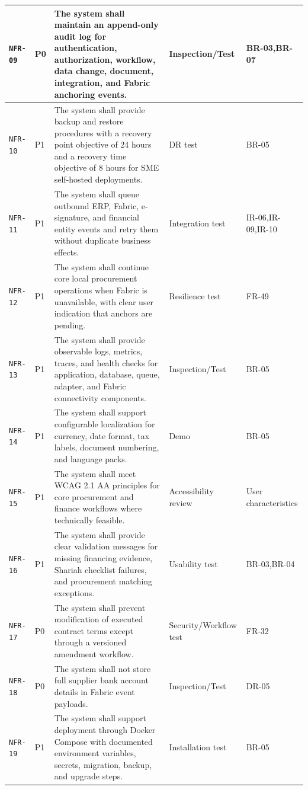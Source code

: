 \documentclass[11pt,a4paper]{article}
\begin{document}
\begin{footnotesize}
\begin{longtable}{@{}p{}p{}p{}p{}p{}@{}}
\texttt{NFR-09} & P0 & The system shall maintain an append-only audit log for authentication, authorization, workflow, data change, document, integration, and Fabric anchoring events. & Inspection/Test & BR-03,BR-07 \\ \hline
\texttt{NFR-10} & P1 & The system shall provide backup and restore procedures with a recovery point objective of 24 hours and a recovery time objective of 8 hours for SME self-hosted deployments. & DR test & BR-05 \\ \hline
\texttt{NFR-11} & P1 & The system shall queue outbound ERP, Fabric, e-signature, and financial entity events and retry them without duplicate business effects. & Integration test & IR-06,IR-09,IR-10 \\ \hline
\texttt{NFR-12} & P1 & The system shall continue core local procurement operations when Fabric is unavailable, with clear user indication that anchors are pending. & Resilience test & FR-49 \\ \hline
\texttt{NFR-13} & P1 & The system shall provide observable logs, metrics, traces, and health checks for application, database, queue, adapter, and Fabric connectivity components. & Inspection/Test & BR-05 \\ \hline
\texttt{NFR-14} & P1 & The system shall support configurable localization for currency, date format, tax labels, document numbering, and language packs. & Demo & BR-05 \\ \hline
\texttt{NFR-15} & P1 & The system shall meet WCAG 2.1 AA principles for core procurement and finance workflows where technically feasible. & Accessibility review & User characteristics \\ \hline
\texttt{NFR-16} & P1 & The system shall provide clear validation messages for missing financing evidence, Shariah checklist failures, and procurement matching exceptions. & Usability test & BR-03,BR-04 \\ \hline
\texttt{NFR-17} & P0 & The system shall prevent modification of executed contract terms except through a versioned amendment workflow. & Security/Workflow test & FR-32 \\ \hline
\texttt{NFR-18} & P0 & The system shall not store full supplier bank account details in Fabric event payloads. & Inspection/Test & DR-05 \\ \hline
\texttt{NFR-19} & P1 & The system shall support deployment through Docker Compose with documented environment variables, secrets, migration, backup, and upgrade steps. & Installation test & BR-05 \\ \hline

\end{longtable}
\end{footnotesize}
\end{document}
